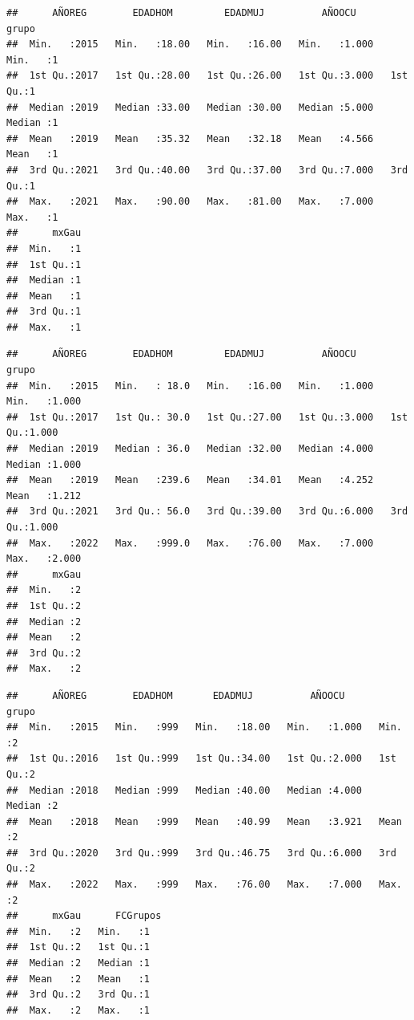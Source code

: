 \documentclass[
]{article}
\begin{document}
\begin{verbatim}
##      AÑOREG        EDADHOM         EDADMUJ          AÑOOCU          grupo  
##  Min.   :2015   Min.   :18.00   Min.   :16.00   Min.   :1.000   Min.   :1  
##  1st Qu.:2017   1st Qu.:28.00   1st Qu.:26.00   1st Qu.:3.000   1st Qu.:1  
##  Median :2019   Median :33.00   Median :30.00   Median :5.000   Median :1  
##  Mean   :2019   Mean   :35.32   Mean   :32.18   Mean   :4.566   Mean   :1  
##  3rd Qu.:2021   3rd Qu.:40.00   3rd Qu.:37.00   3rd Qu.:7.000   3rd Qu.:1  
##  Max.   :2021   Max.   :90.00   Max.   :81.00   Max.   :7.000   Max.   :1  
##      mxGau  
##  Min.   :1  
##  1st Qu.:1  
##  Median :1  
##  Mean   :1  
##  3rd Qu.:1  
##  Max.   :1
\end{verbatim}

\begin{verbatim}
##      AÑOREG        EDADHOM         EDADMUJ          AÑOOCU          grupo      
##  Min.   :2015   Min.   : 18.0   Min.   :16.00   Min.   :1.000   Min.   :1.000  
##  1st Qu.:2017   1st Qu.: 30.0   1st Qu.:27.00   1st Qu.:3.000   1st Qu.:1.000  
##  Median :2019   Median : 36.0   Median :32.00   Median :4.000   Median :1.000  
##  Mean   :2019   Mean   :239.6   Mean   :34.01   Mean   :4.252   Mean   :1.212  
##  3rd Qu.:2021   3rd Qu.: 56.0   3rd Qu.:39.00   3rd Qu.:6.000   3rd Qu.:1.000  
##  Max.   :2022   Max.   :999.0   Max.   :76.00   Max.   :7.000   Max.   :2.000  
##      mxGau  
##  Min.   :2  
##  1st Qu.:2  
##  Median :2  
##  Mean   :2  
##  3rd Qu.:2  
##  Max.   :2
\end{verbatim}

\begin{verbatim}
##      AÑOREG        EDADHOM       EDADMUJ          AÑOOCU          grupo  
##  Min.   :2015   Min.   :999   Min.   :18.00   Min.   :1.000   Min.   :2  
##  1st Qu.:2016   1st Qu.:999   1st Qu.:34.00   1st Qu.:2.000   1st Qu.:2  
##  Median :2018   Median :999   Median :40.00   Median :4.000   Median :2  
##  Mean   :2018   Mean   :999   Mean   :40.99   Mean   :3.921   Mean   :2  
##  3rd Qu.:2020   3rd Qu.:999   3rd Qu.:46.75   3rd Qu.:6.000   3rd Qu.:2  
##  Max.   :2022   Max.   :999   Max.   :76.00   Max.   :7.000   Max.   :2  
##      mxGau      FCGrupos
##  Min.   :2   Min.   :1  
##  1st Qu.:2   1st Qu.:1  
##  Median :2   Median :1  
##  Mean   :2   Mean   :1  
##  3rd Qu.:2   3rd Qu.:1  
##  Max.   :2   Max.   :1
\end{verbatim}
\end{document}
